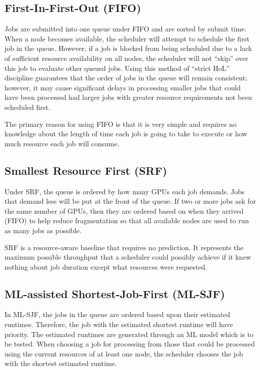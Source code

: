 \subsection{First-In-First-Out (FIFO)}

Jobs are submitted into one queue under FIFO and are sorted by submit time. When a node becomes available, the scheduler will attempt to schedule the first job in the queue. However, if a job is blocked from being scheduled due to a lack of sufficient resource availability on all nodes, the scheduler will not ``skip'' over this job to evaluate other queued jobs. Using this method of ``strict HoL'' discipline guarantees that the order of jobs in the queue will remain consistent; however, it may cause significant delays in processing smaller jobs that could have been processed had larger jobs with greater resource requirements not been scheduled first.

The primary reason for using FIFO is that it is very simple and requires no knowledge about the length of time each job is going to take to execute or how much resource each job will consume.

\clearpage
\subsection{Smallest Resource First (SRF)}

Under SRF, the queue is ordered by how many GPUs each job demands. Jobs that demand less will be put at the front of the queue. If two or more jobs ask for the same number of GPUs, then they are ordered based on when they arrived (FIFO) to help reduce fragmentation so that all available nodes are used to run as many jobs as possible.

SRF is a resource-aware baseline that requires no prediction. It represents the maximum possible throughput that a scheduler could possibly achieve if it knew nothing about job duration except what resources were requested.

\subsection{ML-assisted Shortest-Job-First (ML-SJF)}

In ML-SJF, the jobs in the queue are ordered based upon their estimated runtimes. Therefore, the job with the estimated shortest runtime will have priority. The estimated runtimes are generated through an ML model which is to be tested. When choosing a job for processing from those that could be processed using the current resources of at least one node, the scheduler chooses the job with the shortest estimated runtime.

